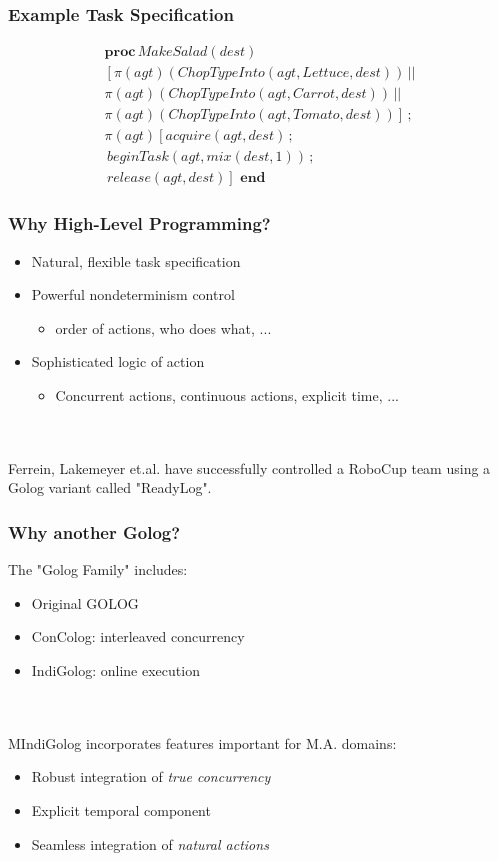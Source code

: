 \documentclass[compress]{beamer}
\begin{document}
\begin{frame}
\frametitle{Example Task Specification}
\begin{multline*}
\mathbf{proc}\, MakeSalad(dest)\\
\left[\pi(agt)(ChopTypeInto(agt,Lettuce,dest))\,||\right.\\
\pi(agt)(ChopTypeInto(agt,Carrot,dest))\,||\\
\left.\pi(agt)(ChopTypeInto(agt,Tomato,dest))\right]\,;\\
\pi(agt)\left[acquire(agt,dest)\,;\right.\\
\,beginTask(agt,mix(dest,1))\,;\\
\left.\, release(agt,dest)\right]\,\,\mathbf{end}
\end{multline*}
\end{frame}

\begin{frame}
\frametitle{Why High-Level Programming?}
\begin{itemize}
\item Natural, flexible task specification
\item Powerful nondeterminism control
  \begin{itemize}
  \item order of actions, who does what, ...
  \end{itemize}
\item Sophisticated logic of action
  \begin{itemize}
  \item Concurrent actions, continuous actions, explicit time, ...
  \end{itemize}
\end{itemize}
\ \\
\ \\
Ferrein, Lakemeyer et.al. have successfully controlled a RoboCup team using
a Golog variant called "ReadyLog".
\end{frame}

\begin{frame}
\frametitle{Why another Golog?}
The "Golog Family" includes:
\begin{itemize}
  \item Original GOLOG
  \item ConColog: interleaved concurrency
  \item IndiGolog: online execution
\end{itemize}
\ \\
\ \\
MIndiGolog incorporates features important for M.A. domains:
\begin{itemize}
\item Robust integration of \emph{true concurrency}
\item Explicit temporal component
\item Seamless integration of \emph{natural actions}
\end{itemize}
\end{frame}
\end{document}

